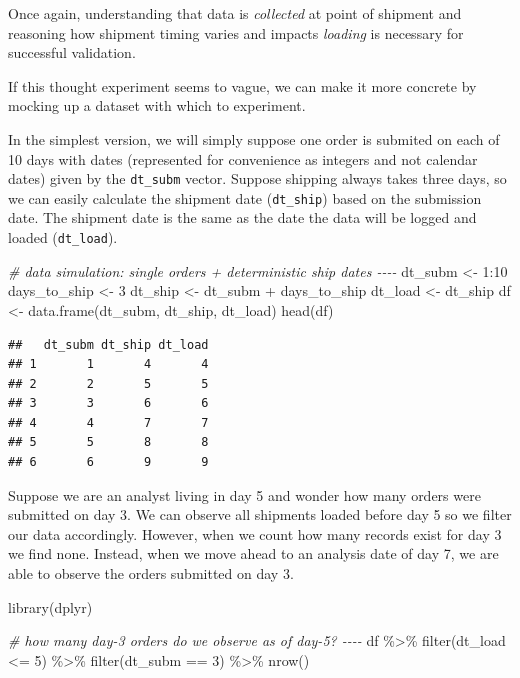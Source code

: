 \documentclass[
]{krantz}
\makeatletter
\newenvironment{Shaded}{\begin{snugshade}}{\end{snugshade}}
\newcommand{\CommentTok}[1]{\textcolor[rgb]{0.37,0.37,0.37}{\textit{#1}}}
\newcommand{\DecValTok}[1]{\textcolor[rgb]{0.06,0.06,0.06}{#1}}
\newcommand{\FunctionTok}[1]{\textcolor[rgb]{0,0,0}{#1}}
\newcommand{\NormalTok}[1]{#1}
\newcommand{\OtherTok}[1]{\textcolor[rgb]{0.37,0.37,0.37}{#1}}
\newcommand{\SpecialCharTok}[1]{\textcolor[rgb]{0,0,0}{#1}}
\newenvironment{kframe}{%
\medskip{}
\setlength{\fboxsep}{.8em}
 \def\at@end@of@kframe{}%
 \ifinner\ifhmode%
  \def\at@end@of@kframe{\end{minipage}}%
  \begin{minipage}{\columnwidth}%
 \fi\fi%
 \def\FrameCommand##1{\hskip\@totalleftmargin \hskip-\fboxsep
 \colorbox{shadecolor}{##1}\hskip-\fboxsep
     \hskip-\linewidth \hskip-\@totalleftmargin \hskip\columnwidth}%
 \MakeFramed {\advance\hsize-\width
   \@totalleftmargin\z@ \linewidth\hsize
   \@setminipage}}%
 {\par\unskip\endMakeFramed%
 \at@end@of@kframe}
\renewenvironment{Shaded}{\begin{kframe}}{\end{kframe}}
\makeatother
\begin{document}
Once again, understanding that data is \emph{collected} at point of shipment and reasoning how shipment timing varies and impacts \emph{loading} is necessary for successful validation.

If this thought experiment seems to vague, we can make it more concrete by mocking up a dataset with which to experiment.

In the simplest version, we will simply suppose one order is submited on each of 10 days with dates (represented for convenience as integers and not calendar dates) given by the \texttt{dt\_subm} vector.
Suppose shipping always takes three days, so we can easily calculate the shipment date (\texttt{dt\_ship}) based on the submission date.
The shipment date is the same as the date the data will be logged and loaded (\texttt{dt\_load}).

\begin{Shaded}
\begin{Highlighting}[]
\CommentTok{\# data simulation: single orders + deterministic ship dates {-}{-}{-}{-}}
\NormalTok{dt\_subm }\OtherTok{\textless{}{-}} \DecValTok{1}\SpecialCharTok{:}\DecValTok{10}
\NormalTok{days\_to\_ship }\OtherTok{\textless{}{-}} \DecValTok{3}
\NormalTok{dt\_ship }\OtherTok{\textless{}{-}}\NormalTok{ dt\_subm }\SpecialCharTok{+}\NormalTok{ days\_to\_ship}
\NormalTok{dt\_load }\OtherTok{\textless{}{-}}\NormalTok{ dt\_ship}
\NormalTok{df }\OtherTok{\textless{}{-}} \FunctionTok{data.frame}\NormalTok{(dt\_subm, dt\_ship, dt\_load)}
\FunctionTok{head}\NormalTok{(df)}
\end{Highlighting}
\end{Shaded}

\begin{verbatim}
##   dt_subm dt_ship dt_load
## 1       1       4       4
## 2       2       5       5
## 3       3       6       6
## 4       4       7       7
## 5       5       8       8
## 6       6       9       9
\end{verbatim}

Suppose we are an analyst living in day 5 and wonder how many orders were submitted on day 3.
We can observe all shipments loaded before day 5 so we filter our data accordingly.
However, when we count how many records exist for day 3 we find none.
Instead, when we move ahead to an analysis date of day 7, we are able to observe the orders submitted on day 3.

\begin{Shaded}
\begin{Highlighting}[]
\FunctionTok{library}\NormalTok{(dplyr)}

\CommentTok{\# how many day{-}3 orders do we observe as of day{-}5? {-}{-}{-}{-}}
\NormalTok{df }\SpecialCharTok{\%\textgreater{}\%} 
  \FunctionTok{filter}\NormalTok{(dt\_load }\SpecialCharTok{\textless{}=} \DecValTok{5}\NormalTok{) }\SpecialCharTok{\%\textgreater{}\%} 
  \FunctionTok{filter}\NormalTok{(dt\_subm }\SpecialCharTok{==} \DecValTok{3}\NormalTok{) }\SpecialCharTok{\%\textgreater{}\%} 
  \FunctionTok{nrow}\NormalTok{()}
\end{Highlighting}
\end{Shaded}
\end{document}
